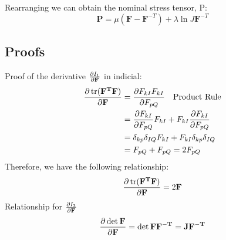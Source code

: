 \documentclass[12pt,3p]{article}
\begin{document}
Rearranging we can obtain the nominal stress tensor, P: 
\begin{equation}\label{P}
\mathbf{P} = \mu (\mathbf{F} - \mathbf{F}^{-T} ) + \lambda \ln J \mathbf{F}^{-T}
\end{equation}


\subsection{Proofs}
Proof of the derivative $\pdv{I_1}{\mathbf{F}}$ in indicial: 
\begin{align*}
\pdv{\trace(\mathbf{F^T} \mathbf{F})}{\mathbf{F}} &= \pdv{F_{kI} F_{kI}}{F_{pQ}} \quad \text{Product Rule}\\ 
									&= \pdv{F_{kI}}{F_{pQ}} F_{kI} + F_{kI} \pdv{F_{kI}}{F_{pQ}} \\
									&= \delta_{kp} \delta_{IQ} F_{kI} + F_{kI} \delta_{kp} \delta_{IQ} \\
									&= F_{pQ} + F_{pQ} = 2 F_{pQ}
\end{align*}
Therefore, we have the following relationship: 
\begin{equation}\label{proof1}
\pdv{\trace(\mathbf{F^T} \mathbf{F})}{\mathbf{F}} = 2 \mathbf{F}
\end{equation}
Relationship for $\pdv{I_3}{\mathbf{F}}$
\begin{align*}
\pdv{\det \mathbf{F} }{\mathbf{F}} = \det \mathbf{F} \mathbf{F^{-T}} = \mathbf{J} \mathbf{F^{-T}}
\end{align*}
\end{document}
